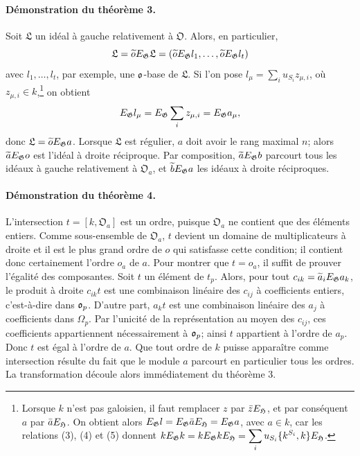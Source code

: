\paragraph{Démonstration du théorème 3.}
Soit \(\mathfrak L\) un idéal à gauche relativement à \(\mathfrak O\). Alors, en particulier,
\[
        \mathfrak L=\widetilde oE_\mathfrak G\mathfrak L
        =(\widetilde oE_\mathfrak G l_1,\ldots,\widetilde oE_\mathfrak G l_t)
\]
avec \(l_1,\ldots,l_t\), par exemple, une \(\mathfrak o\)-base de \(\mathfrak L\). Si l'on pose \(l_\mu=\sum_i u_{S_i}z_{\mu,i}\), où \(z_{\mu,i}\in k\),\footnote{Lorsque \(k\) n'est pas galoisien, il faut remplacer \(z\) par \(\bar zE_\mathfrak H\), et par conséquent \(a\) par \(\bar aE_\mathfrak H\). On obtient alors \(\displaystyle E_\mathfrak G l=E_\mathfrak G\bar aE_\mathfrak H=E_\mathfrak G a\), avec \(a\in k\), car les relations (3), (4) et (5) donnent \(\displaystyle kE_\mathfrak G k=kE_\mathfrak G kE_\mathfrak H=\sum_i u_{S_i}\{k^{S_i},k\}E_\mathfrak H\).} on obtient
\[
        E_\mathfrak G l_\mu=E_\mathfrak G\sum_i z_{\mu,i}=E_\mathfrak G a_\mu,
\]
donc \(\mathfrak L=\widetilde oE_\mathfrak G a\). Lorsque \(\mathfrak L\) est régulier, \(a\) doit avoir le rang maximal \(n\); alors \(\widetilde aE_\mathfrak G o\) est l'idéal à droite réciproque. Par composition, \(\widetilde aE_\mathfrak G b\) parcourt tous les idéaux à gauche relativement à \(\mathfrak O_a\), et \(\widetilde bE_\mathfrak G a\) les idéaux à droite réciproques.

\paragraph{Démonstration du théorème 4.}
L'intersection \(t=[k,\mathfrak O_a]\) est un ordre, puisque \(\mathfrak O_a\) ne contient que des éléments entiers. Comme sous-ensemble de \(\mathfrak O_a\), \(t\) devient un domaine de multiplicateurs à droite et il est le plus grand ordre de \(o\) qui satisfasse cette condition; il contient donc certainement l'ordre \(o_a\) de \(a\). Pour montrer que \(t=o_a\), il suffit de prouver l'égalité des composantes. Soit \(t\) un élément de \(t_p\). Alors, pour tout \(c_{ik}=\widetilde a_iE_\mathfrak G a_k\), le produit à droite \(c_{ik}t\) est une combinaison linéaire des \(c_{ij}\) à coefficients entiers, c'est-à-dire dans \(\mathfrak o_p\). D'autre part, \(a_kt\) est une combinaison linéaire des \(a_j\) à coefficients dans \(\Omega_p\). Par l'unicité de la représentation au moyen des \(c_{ij}\), ces coefficients appartiennent nécessairement à \(\mathfrak o_p\); ainsi \(t\) appartient à l'ordre de \(a_p\). Donc \(t\) est égal à l'ordre de \(a\). Que tout ordre de \(k\) puisse apparaître comme intersection résulte du fait que le module \(a\) parcourt en particulier tous les ordres. La transformation découle alors immédiatement du théorème 3.

